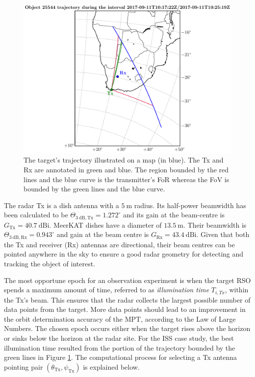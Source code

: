 \documentclass[conference]{IEEEtran}
\begin{document}
\begin{figure}[ht]
	\centering
	\includegraphics[scale=0.45]{main057iss14map.pdf}
	\caption{The target’s trajectory illustrated on a map (in blue). The Tx and Rx are annotated in green and blue. The region bounded by the red lines and the blue curve is the transmitter’s FoR whereas the FoV is bounded by the green lines and the blue curve.} \label{fig:schedu:map}
\end{figure}

The radar Tx is a dish antenna with a $5~\mathrm{m}$ radius. Its half-power beamwidth has been calculated to be $\Theta_{3~\mathrm{dB},\text{Tx}}=1.272^\circ$ and its gain at the beam-centre is $G_{\text{Tx}}=40.7~\mathrm{dBi}$. MeerKAT dishes have a diameter of $13.5~\mathrm{m}$. Their beamwidth is $\Theta_{3~\mathrm{dB},\text{Rx}}=0.943^\circ$ and gain at the beam centre is $G_{\text{Rx}}=43.4~\mathrm{dBi}$. Given that both the Tx and receiver (Rx) antennas are directional, their beam centres can be pointed anywhere in the sky to ensure a good radar geometry for detecting and tracking the object of interest.

The most opportune epoch for an observation experiment is when the target RSO spends a maximum amount of time, referred to as \emph{illumination time} $T_{i,Tx}$, within the Tx's beam. This ensures that the radar collects the largest possible number of data points from the target. More data points should lead to an improvement in the orbit determination accuracy of the MPT, according to the Law of Large Numbers. The chosen epoch occurs either when the target rises above the horizon or sinks below the horizon at the radar site. For the ISS case study, the best illumination time resulted from the portion of the trajectory bounded by the green lines in Figure \ref{fig:schedu:map}. The computational process for selecting a Tx antenna pointing pair $( \theta_{\text{Tx}} , \psi_{\text{Tx}})$ is explained below.
\end{document}
